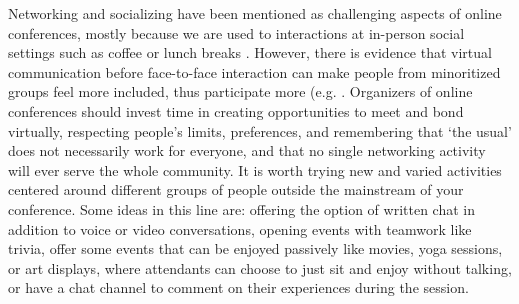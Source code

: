 \documentclass[10pt,letterpaper]{article}
\begin{document}
Networking and socializing have been mentioned as challenging aspects of online conferences, mostly because we are used to interactions at in-person social settings such as coffee or lunch breaks \cite{salibaGettingGripsOnline2020, roosOnlineConferencesNew2020}. 
However, there is evidence that virtual communication before face-to-face interaction can make people from minoritized groups feel more included, thus participate more (e.g. \cite{trianaDoesOrderFacetoFace2012,blackEngenderingBelongingThoughtful2020}.
Organizers of online conferences should invest time in creating opportunities to meet and bond virtually, respecting people's limits, preferences, and remembering that `the usual' does not necessarily work for everyone, and that no single networking activity will ever serve the whole community. 
It is worth trying new and varied activities centered around different groups of people outside the mainstream of your conference.
Some ideas in this line are: offering the option of written chat in addition to voice or video conversations, opening events with teamwork like trivia, offer some events that can be enjoyed passively like movies, yoga sessions, or art displays, where attendants can choose to just sit and enjoy without talking, or have a chat channel to comment on their experiences during the session. 
\end{document}
